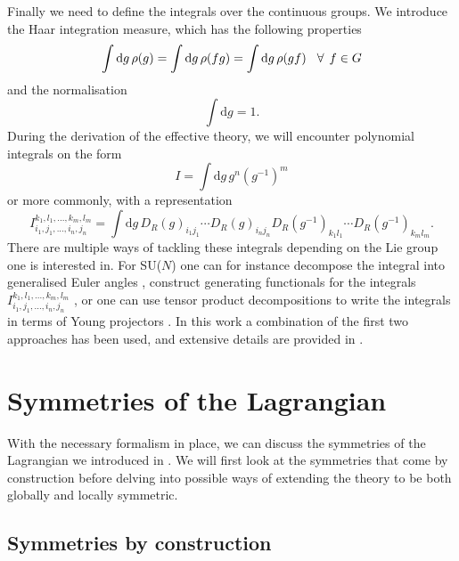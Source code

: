 Finally we need to define the integrals over the continuous groups. We introduce
the Haar integration measure, which has the following properties
%
\begin{equation}
  \int \mathrm{d}g \, \rho(g) = \int \mathrm{d}g \, \rho(fg) 
    = \int \mathrm{d}g \, \rho(gf) \hskip2ex \forall \hskip1ex f \in G
\end{equation}
%
and the normalisation
%
\begin{equation}
  \int \mathrm{d}g = 1.
\end{equation}
%
During the derivation of the effective theory, we will encounter polynomial
integrals on the form
%
\begin{equation}
  I = \int \mathrm{d} g \, g^n (g^{-1})^m
\end{equation}
%
or more commonly, with a representation
%
\begin{equation} \label{eq-group-integrals-representation}
  I_{i_1,j_1,...,i_n,j_n}^{k_1,l_1,...,k_m,l_m} = \int \mathrm{d} g \,
    D_R(g)_{i_1j_1} \cdots D_R(g)_{i_nj_n} D_R(g^{-1})_{k_1l_1} \cdots D_R(g^{-1})_{k_ml_m}.
\end{equation}
%
There are multiple ways of tackling these integrals depending on the Lie group
one is interested in. For SU($N$) one can for instance decompose the integral
into generalised Euler angles \citep[as described in][]{Tilma:2004kp}, construct
generating functionals for the integrals $I_{i_1,j_1,...,i_n,j_n}^{k_1,l_1,...,k_m,l_m}$
\citep[details in][]{Creutz:1978ub}, or one can use tensor product
decompositions to write the integrals in terms of Young projectors
\citep{Myers:2014dia}. In this work a combination of the first two approaches
has been used, and extensive details are provided in
.

\section{Symmetries of the Lagrangian} \label{sec-symmetries}

With the necessary formalism in place, we can discuss the symmetries of the
Lagrangian we introduced in . We will first look at the
symmetries that come by construction before delving into possible ways of
extending the theory to be both globally and locally symmetric.

\subsection{Symmetries by construction}

